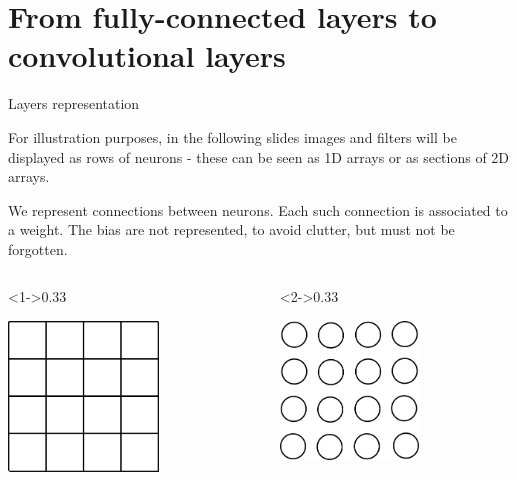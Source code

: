 \documentclass[xcolor=pdftex,dvipsnames,table,mathserif]{beamer}
\begin{document}
\section{From fully-connected layers to convolutional layers}

\begin{frame}{Layers representation}

    \begin{block}{}
      For illustration purposes, in the following slides images and filters will be displayed as rows of neurons - these can be seen as 1D arrays or as sections of 2D arrays.

      We represent connections between neurons. Each such connection is associated to a weight. The bias are not represented, to avoid clutter, but must not be forgotten.
  \end{block}

  \begin{columns}

    \begin{column}<1->{0.33\textwidth}
      \begin{center}
        \includegraphics[width=0.60\textwidth]{image_as_pixels.png}
      \end{center}
    \end{column}

    \begin{column}<2->{0.33\textwidth}
      \begin{center}
        \includegraphics[width=0.60\textwidth]{image_as_neurons.png}


\end{center}
\end{column}
\end{columns}
\end{frame}
\end{document}
